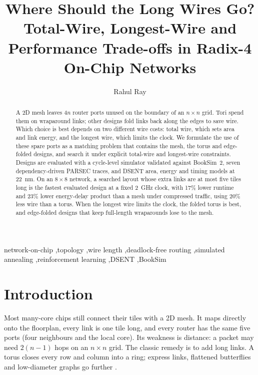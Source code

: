 \documentclass[preprint,12pt,a4paper]{elsarticle}
\begin{document}
\begin{frontmatter}

\title{Where Should the Long Wires Go? Total-Wire, Longest-Wire and Performance Trade-offs in Radix-4 On-Chip Networks}

\author{Rahul Ray}
\address{Department of Computer Science and Engineering, Assam University, Silchar 788011, India (B.Tech. 2023)}

\begin{abstract}
A 2D mesh leaves $4n$ router ports unused on the boundary of an $n\times n$
grid. Tori spend them on wraparound links; other designs fold links back
along the edges to save wire. Which choice is best depends on two different
wire costs: total wire, which sets area and link energy, and the longest
wire, which limits the clock. We formulate the use of these spare ports as a
matching problem that contains the mesh, the torus and edge-folded designs,
and search it under explicit total-wire and longest-wire constraints.
Designs are evaluated with a cycle-level simulator validated against
BookSim~2, seven dependency-driven PARSEC traces, and DSENT area, energy and
timing models at 22~nm. On an $8\times 8$ network, a searched layout whose
extra links are at most five tiles long is the fastest evaluated design at a
fixed 2~GHz clock, with 17\% lower runtime and 23\% lower energy-delay
product than a mesh under compressed traffic, using 20\% less wire than a
torus. When the longest wire limits the clock, the folded torus is best, and
edge-folded designs that keep full-length wraparounds lose to the mesh.
\end{abstract}

\begin{keyword}
network-on-chip \sep topology \sep wire length \sep deadlock-free routing \sep simulated annealing \sep reinforcement learning \sep DSENT \sep BookSim
\end{keyword}

\end{frontmatter}

\linenumbers

\section{Introduction}
\label{sec:intro}

Most many-core chips still connect their tiles with a 2D mesh. It maps
directly onto the floorplan, every link is one tile long, and every router
has the same five ports (four neighbours and the local core). Its weakness
is distance: a packet may need $2(n-1)$ hops on an $n\times n$ grid. The
classic remedy is to add long links. A torus closes every row and column
into a ring; express links, flattened butterflies and low-diameter graphs
go further \cite{dally2004principles,slimnoc,shg}.
\end{document}

